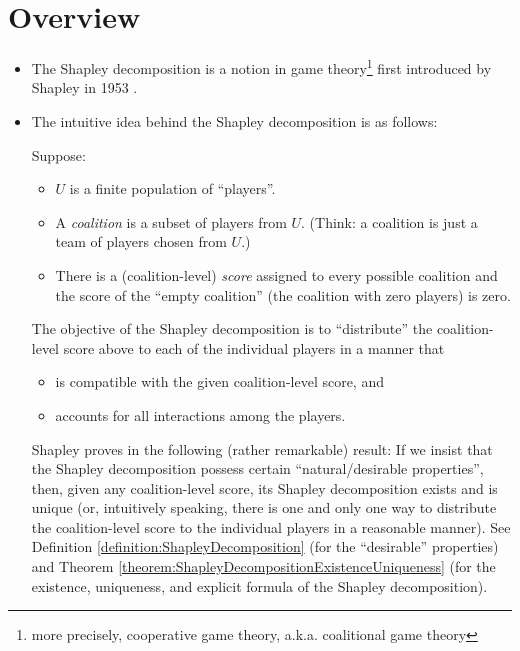 

\section{Overview}
\setcounter{theorem}{0}
\setcounter{equation}{0}


\renewcommand{\theenumi}{\roman{enumi}}
\renewcommand{\labelenumi}{\textnormal{(\theenumi)}$\;\;$}


\begin{itemize}
\item
	The Shapley decomposition is a notion
	in game theory\footnote{more precisely, cooperative game theory, a.k.a. coalitional game theory}
	first introduced by Shapley in 1953 \cite{Shapley1953}.
\item
	The intuitive idea behind the Shapley decomposition is as follows:

	Suppose:
	\begin{itemize}
	\item
		$U$ is a finite population of ``players''.
	\item
		A \textit{coalition} is a subset of players from $U$.
		(Think: a coalition is just a team of players chosen from $U$.)
	\item
		There is a (coalition-level) \textit{score} assigned to every possible coalition
		and the score of the ``empty coalition'' (the coalition with zero players) is zero.
	\end{itemize}
	
	The objective of the Shapley decomposition is to ``distribute'' the coalition-level score above
	to each of the individual players in a manner
	that
	\begin{itemize}
	\item
		is compatible with the given coalition-level score, and
	\item
		accounts for all interactions among the players.
	\end{itemize}
	
	Shapley proves in \cite{Shapley1953} the following (rather remarkable) result:
	If we insist that the Shapley decomposition possess certain ``natural/desirable properties'',
	then, given any coalition-level score, its Shapley decomposition exists and is unique
	(or, intuitively speaking, there is {\color{red}one and only one} way to distribute
	the coalition-level score to the individual players in a reasonable manner).
	See Definition \ref{definition:ShapleyDecomposition} (for the ``desirable'' properties) and
	Theorem \ref{theorem:ShapleyDecompositionExistenceUniqueness}
	(for the existence, uniqueness, and explicit formula of the Shapley decomposition).


\end{itemize}
